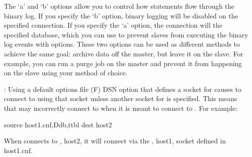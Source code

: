 \documentclass[letterpaper,10pt,english]{sphinxmanual}
\begin{document}
\begin{fulllineitems}
\sphinxAtStartPar
The ‘a’ and ‘b’ options allow you to control how statements flow through the
binary log.  If you specify the ‘b’ option, binary logging will be disabled on
the specified connection.  If you specify the ‘a’ option, the connection will
 the specified database, which you can use to prevent slaves from
executing the binary log events with  options.  These
two options can be used as different methods to achieve the same goal: archive
data off the master, but leave it on the slave.  For example, you can run a
purge job on the master and prevent it from happening on the slave using your
method of choice.

\sphinxAtStartPar
{}: Using a default options file (F) DSN option that defines a
socket for {\hyperref[\detokenize{mariadb-archiver:cmdoption-mariadb-archiver-source}]{}} causes  to connect to {\hyperref[\detokenize{mariadb-archiver:cmdoption-mariadb-archiver-dest}]{}} using
that socket unless another socket for {\hyperref[\detokenize{mariadb-archiver:cmdoption-mariadb-archiver-dest}]{}} is specified.  This
means that  may incorrectly connect to {\hyperref[\detokenize{mariadb-archiver:cmdoption-mariadb-archiver-source}]{}} when it
is meant to connect to {\hyperref[\detokenize{mariadb-archiver:cmdoption-mariadb-archiver-dest}]{}}.  For example:

\begin{sphinxVerbatim}[commandchars=\\\{\}]
\PYGZhy{}\PYGZhy{}source host1.cnf,Ddb,ttbl \PYGZhy{}\PYGZhy{}dest host2
\end{sphinxVerbatim}

\sphinxAtStartPar
When  connects to {\hyperref[\detokenize{mariadb-archiver:cmdoption-mariadb-archiver-dest}]{}}, host2, it will connect via the
{\hyperref[\detokenize{mariadb-archiver:cmdoption-mariadb-archiver-source}]{}}, host1, socket defined in host1.cnf.

\end{fulllineitems}
\end{document}
